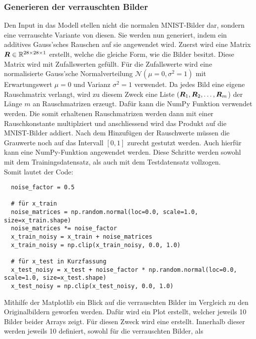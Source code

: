 \subsubsection{Generieren der verrauschten Bilder}
Den Input in das Modell stellen nicht die normalen MNIST-Bilder dar, sondern
eine verrauschte Variante von diesen. Sie werden nun generiert, indem ein
additives Gauss'sches Rauschen auf sie angewendet wird.
\para{}
Zuerst wird eine Matrix $\bm{R} \in \mathbb{R}^{28 \times 28 \times 1}$ erstellt, welche die gleiche Form, wie die
Bilder besitzt. Diese Matrix wird mit Zufallswerten gefüllt. Für die
Zufallswerte wird eine normalisierte Gauss'sche Normalverteilung
$\mathcal{N}(\mu = 0, \sigma^2 = 1)$ mit Erwartungswert $\mu = 0$ und Varianz
$\sigma^2 = 1$ verwendet. Da jedes Bild eine eigene Rauschmatrix verlangt,
wird zu diesem Zweck eine Liste $(\bm{R}_1,\bm{R}_2,\ldots,\bm{R}_m$) der Länge $m$ an
Rauschmatrizen erzeugt. Dafür kann die NumPy Funktion
 verwendet werden.
Die somit erhaltenen Rauschmatrizen werden dann mit einer Rauschkonstante
 multiplziert und anschliessend wird das Produkt auf die
MNIST-Bilder addiert.
Nach dem Hinzufügen der Rauschwerte müssen die Grauwerte noch auf das Intervall
$[0,1]$ zurecht gestutzt werden. Auch hierfür kann eine NumPy-Funktion
 angewendet werden. Diese Schritte werden sowohl mit dem
Trainingsdatensatz, als auch mit dem Testdatensatz vollzogen. \\
Somit lautet der Code:
\begin{verbatim}
  noise_factor = 0.5

  # für x_train
  noise_matrices = np.random.normal(loc=0.0, scale=1.0, size=x_train.shape)
  noise_matrices *= noise_factor
  x_train_noisy = x_train + noise_matrices
  x_train_noisy = np.clip(x_train_noisy, 0.0, 1.0)

  # für x_test in Kurzfassung
  x_test_noisy = x_test + noise_factor * np.random.normal(loc=0.0, scale=1.0, size=x_test.shape)
  x_test_noisy = np.clip(x_test_noisy, 0.0, 1.0)
\end{verbatim}
\para{}
Mithilfe der Matplotlib ein Blick auf die verrauschten Bilder im Vergleich zu
den Originalbildern geworfen werden.
Dafür wird ein Plot erstellt, welcher jeweils 10 Bilder beider Arrays zeigt.
\para{}
Für diesen Zweck wird eine  erstellt. Innerhalb dieser
werden jeweils 10  definiert, sowohl für die verrauschten Bilder, als
